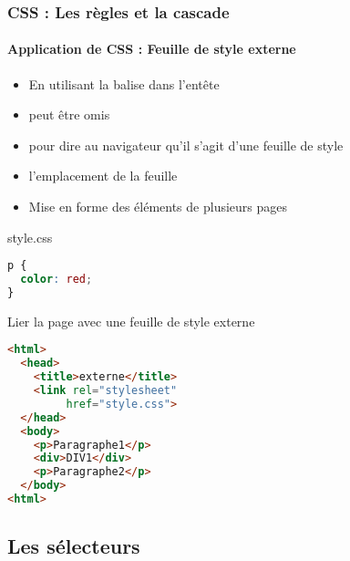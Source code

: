 \documentclass[xcolor=table]{beamer}
\begin{document}
\begin{frame}[fragile]
\frametitle{CSS : Les règles et la cascade}
\framesubtitle{Application de CSS : Feuille de style externe}

\begin{minipage}{0.60\textwidth} 
	\begin{itemize}
		\item En utilisant la balise  dans l'entête
		\item {} peut être omis
		\item {} pour dire au navigateur qu'il s'agit d'une feuille de style
		\item {} l'emplacement de la feuille
		\item Mise en forme des éléments de plusieurs pages 
	\end{itemize}
\begin{minipage}{0.95\textwidth} 
\begin{block}{style.css}
	\lstset{escapeinside=**}
	\scriptsize\bfseries\vspace{-6pt}
\begin{lstlisting}[language={CSS}]
p {
  color: red;
}
\end{lstlisting}\vspace{-6pt}
\end{block}
\end{minipage}
\end{minipage}
%
\begin{minipage}{0.38\textwidth}
\begin{block}{Lier la page avec une feuille de style externe}
\lstset{escapeinside=**}
\scriptsize\bfseries
\begin{lstlisting}[language={html}]
<html>
  <head>
    <title>externe</title>
    <link rel="stylesheet" 
         href="style.css">
  </head>
  <body>
    <p>Paragraphe1</p>
    <div>DIV1</div>
    <p>Paragraphe2</p>
  </body>
<html>
\end{lstlisting}
\end{block}
\end{minipage}

\end{frame}

\subsection{Les sélecteurs}
\end{document}
